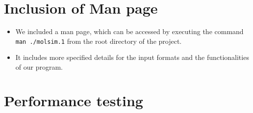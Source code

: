 \documentclass{article}
\begin{document}
\section{Inclusion of Man page}
\label{sec:man}

\begin{itemize}
    \item We included a man page, which can be accessed by executing the command \texttt{man ./molsim.1} from the root directory of the project.
    \item It includes more specified details for the input formats and the functionalities of our program.
\end{itemize}

\section{Performance testing}
\label{sec:perf}
\end{document}

